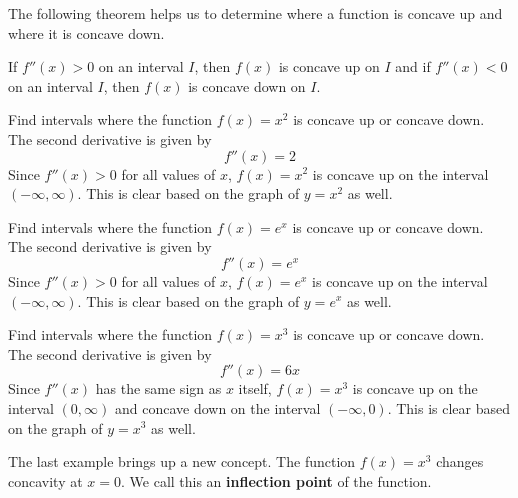 \documentclass[handout]{ximera}
\begin{document}

The following theorem helps us to determine where a function is concave up and 
where it is concave down.\\

\begin{theorem}[Concavity]
If $f''(x) > 0$ on an interval $I$, then $f(x)$ is concave up on $I$ and
if $f''(x) < 0$ on an interval $I$, then $f(x)$ is concave down on $I$.
\end{theorem}



\begin{example}[example 1]
Find intervals where the function $f(x) = x^2$ is concave up or concave down.\\
The second derivative is given by
\[
f''(x) = 2
\]
Since $f''(x) > 0$ for all values of $x$, $f(x) = x^2$ is concave up on the 
interval $(-\infty, \infty)$. This is clear based on the graph of $y = x^2$ as well.
\end{example}

\begin{example}[example 2]
Find intervals where the function $f(x) = e^x$ is concave up or concave down.\\
The second derivative is given by
\[
f''(x) = e^x
\]
Since $f''(x) > 0$ for all values of $x$, $f(x) = e^x$ is concave up on the 
interval $(-\infty, \infty)$. This is clear based on the graph of $y = e^x$ as well.
\end{example}


\begin{example}[example 3]
Find intervals where the function $f(x) = x^3$ is concave up or concave down.\\
The second derivative is given by
\[
f''(x) = 6x
\]
Since $f''(x)$ has the same sign as $x$ itself, $f(x) = x^3$ is concave up on the 
interval $(0, \infty)$ and concave down on the interval $(-\infty, 0)$. 
This is clear based on the graph of $y = x^3$ as well.
\end{example}



The last example brings up a new concept.  The function $f(x) = x^3$ changes concavity at $x = 0$.  
We call this an {\bf inflection point} of the function.\\
\end{document}

